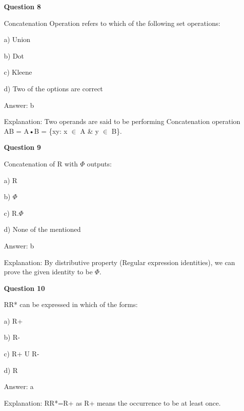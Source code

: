 \documentclass{article}
\begin{document}
\begin{mdframed}[linewidth=1pt, roundcorner=5pt, linecolor=gray!30, backgroundcolor=gray!5]
\textbf{Question 8} 

Concatenation Operation refers to which of the following set operations:

a) Union

b) Dot

c) Kleene

d) Two of the options are correct
\vspace{5pt} \par
\begin{tcolorbox}[colback=green!5, colframe=green!40!black, title=Solution]
Answer: b

Explanation: Two operands are said to be performing Concatenation operation AB = A•B = \{xy: x $\in$ A \& y $\in$ B\}.
\end{tcolorbox}
\end{mdframed}
\newpage

\begin{mdframed}[linewidth=1pt, roundcorner=5pt, linecolor=gray!30, backgroundcolor=gray!5]
\textbf{Question 9} 

Concatenation of R with $\Phi$ outputs:

a) R

b) $\Phi$

c) R.$\Phi$

d) None of the mentioned
\vspace{5pt} \par
\begin{tcolorbox}[colback=green!5, colframe=green!40!black, title=Solution]
Answer: b

Explanation: By distributive property (Regular expression identities), we can prove the given identity to be $\Phi$.
\end{tcolorbox}
\end{mdframed}

\begin{mdframed}[linewidth=1pt, roundcorner=5pt, linecolor=gray!30, backgroundcolor=gray!5]
\textbf{Question 10} 

RR* can be expressed in which of the forms:

a) R+

b) R-

c) R+ U R-

d) R
\vspace{5pt} \par
\begin{tcolorbox}[colback=green!5, colframe=green!40!black, title=Solution]
Answer: a

Explanation: RR*=R+ as R+ means the occurrence to be at least once.
\end{tcolorbox}
\end{mdframed}
\newpage
\end{document}

